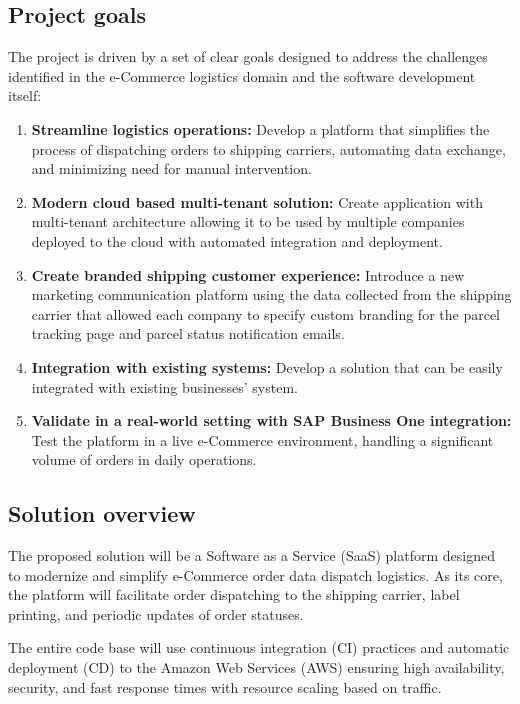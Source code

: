 \subsection*{Project goals}
\label{subsec:project-goals}
The project is driven by a set of clear goals designed to address the challenges identified in the e-Commerce logistics domain and the software development itself:
\begin{enumerate}[label=\bfseries G\arabic*:,leftmargin=*]
    \item \textbf{Streamline logistics operations:} Develop a platform that simplifies the process of dispatching orders to shipping carriers, automating data exchange, and minimizing need for manual intervention.
    \item \textbf{Modern cloud based multi-tenant solution:} Create application with multi-tenant architecture allowing it to be used by multiple companies deployed to the cloud with automated integration and deployment. 
    \item \textbf{Create branded shipping customer experience:} Introduce a new marketing communication platform using the data collected from the shipping carrier that allowed each company to specify custom branding for the parcel tracking page and parcel status notification emails.
    \item \textbf{Integration with existing systems:} Develop a solution that can be easily integrated with existing businesses' system.
    \item \textbf{Validate in a real-world setting with SAP Business One integration:} Test the platform in a live e-Commerce environment, handling a significant volume of orders in daily operations.
\end{enumerate}

\subsection*{Solution overview}
\label{subsec:solution-overview}
The proposed solution will be a Software as a Service (\ac{SaaS}) platform designed to modernize and simplify e-Commerce order data dispatch logistics. As its core, the platform will facilitate order dispatching to the shipping carrier, label printing, and periodic updates of order statuses. 

The entire code base will use continuous integration (\ac{CI}) practices and automatic deployment (\ac{CD}) to the Amazon Web Services (\ac{AWS}) ensuring high availability, security, and fast response times with resource scaling based on traffic.

